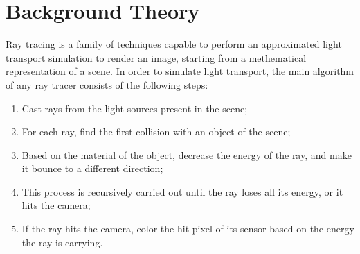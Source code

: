 \documentclass[11pt,a4paper,twocolumn]{article}
\begin{document}



\section{Background Theory}
Ray tracing is a family of techniques capable to perform an approximated light transport simulation to render an image, starting from a methematical representation of a scene. In order to simulate light transport, the main algorithm of any ray tracer consists of the following steps:
\begin{enumerate}
    \item Cast rays from the light sources present in the scene;
    \item For each ray, find the first collision with an object of the scene;
    \item Based on the material of the object, decrease the energy of the ray, and make it bounce to a different direction;
    \item This process is recursively carried out until the ray loses all its energy, or it hits the camera;
    \item If the ray hits the camera, color the hit pixel of its sensor based on the energy the ray is carrying.
\end{enumerate}
\end{document}
